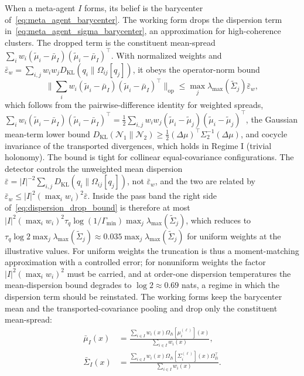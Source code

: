 When a meta-agent $I$ forms, its belief is the barycenter of~\eqref{eq:meta_agent_barycenter}. The working form drops the dispersion term in~\eqref{eq:meta_agent_sigma_barycenter}, an approximation for high-coherence clusters. The dropped term is the constituent mean-spread $\sum_i w_i (\tilde{\mu}_i - \bar{\mu}_I)(\tilde{\mu}_i - \bar{\mu}_I)^\top$. With normalized weights and $\bar{\varepsilon}_w = \sum_{i,j} w_i w_j D_{\mathrm{KL}}(q_i \| \Omega_{ij}[q_j])$, it obeys the operator-norm bound
\begin{equation}
\Big\|\sum_i w_i (\tilde{\mu}_i - \bar{\mu}_I)(\tilde{\mu}_i - \bar{\mu}_I)^\top\Big\|_{\mathrm{op}} \le \max_j \lambda_{\max}(\tilde{\Sigma}_j) \bar{\varepsilon}_w,
\label{eq:dispersion_drop_bound}
\end{equation}
which follows from the pairwise-difference identity for weighted spreads, $\sum_i w_i (\tilde{\mu}_i - \bar{\mu}_I)(\tilde{\mu}_i - \bar{\mu}_I)^\top = \tfrac12\sum_{i,j} w_i w_j (\tilde{\mu}_i - \tilde{\mu}_j)(\tilde{\mu}_i - \tilde{\mu}_j)^\top$, the Gaussian mean-term lower bound $D_{\mathrm{KL}}(\mathcal{N}_1 \| \mathcal{N}_2) \ge \tfrac12(\Delta\mu)^\top\Sigma_2^{-1}(\Delta\mu)$, and cocycle invariance of the transported divergences, which holds in Regime I (trivial holonomy). The bound is tight for collinear equal-covariance configurations. The detector controls the unweighted mean dispersion $\bar{\varepsilon} = |I|^{-2}\sum_{i,j} D_{\mathrm{KL}}(q_i \| \Omega_{ij}[q_j])$, not $\bar{\varepsilon}_w$, and the two are related by $\bar{\varepsilon}_w \le |I|^2 (\max_i w_i)^2 \bar{\varepsilon}$. Inside the pass band the right side of~\eqref{eq:dispersion_drop_bound} is therefore at most $|I|^2(\max_i w_i)^2 \tau_q\log(1/\Gamma_{\min}) \max_j \lambda_{\max}(\tilde{\Sigma}_j)$, which reduces to $\tau_q \log 2 \max_j \lambda_{\max}(\tilde{\Sigma}_j) \approx 0.035 \max_j \lambda_{\max}(\tilde{\Sigma}_j)$ for uniform weights at the illustrative values. For uniform weights the truncation is thus a moment-matching approximation with a controlled error; for nonuniform weights the factor $|I|^2(\max_i w_i)^2$ must be carried, and at order-one dispersion temperatures the mean-dispersion bound degrades to $\log 2 \approx 0.69$ nats, a regime in which the dispersion term should be reinstated. The working forms keep the barycenter mean and the transported-covariance pooling and drop only the constituent mean-spread:
\begin{align}
\bar{\mu}_I(x) &= \frac{\sum_{i \in I} w_i(x) \Omega_{Ii}[\mu_i^{(\ell)}](x)}{\sum_{i \in I} w_i(x)},
\label{eq:meta_agent_mu_impl}
\\
\bar{\Sigma}_I(x) &= \frac{\sum_{i \in I} w_i(x) \Omega_{Ii}[\Sigma_i^{(\ell)}](x) \Omega_{Ii}^\top}{\sum_{i \in I} w_i(x)}.
\label{eq:meta_agent_sigma_impl}
\end{align}
